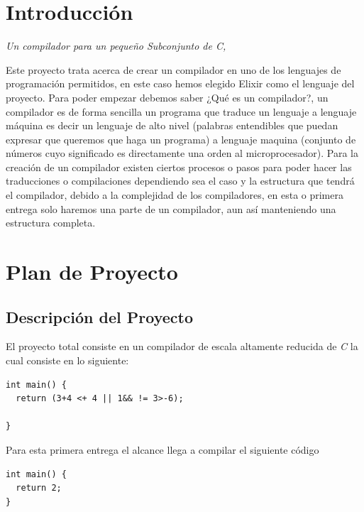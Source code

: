 \documentclass{article}
\begin{document}
\tableofcontents{}

\section{Introducción}

\begin{flushright}
\textit{Un compilador para un pequeño Subconjunto de C,}  
\end{flushright}


Este proyecto trata acerca de crear un compilador en uno de los lenguajes de
programación permitidos, en este caso hemos elegido Elixir como el lenguaje
del proyecto. Para poder empezar debemos saber ¿Qué es un compilador?, un
compilador es de forma sencilla un programa que traduce un lenguaje a lenguaje
máquina es decir un lenguaje de alto nivel (palabras entendibles que puedan
expresar que queremos que haga un programa) a lenguaje maquina (conjunto
de números cuyo significado es directamente una orden al microprocesador).
Para la creación de un compilador existen ciertos procesos o pasos para poder
hacer las traducciones o compilaciones dependiendo sea el caso y la estructura
que tendrá el compilador, debido a la complejidad de los compiladores, en esta
o primera entrega solo haremos una parte de un compilador, aun así manteniendo
una estructura completa.

\section{Plan de Proyecto}

\subsection{Descripción del Proyecto}

El proyecto total consiste en un compilador de escala altamente reducida de
\textit{C} la cual consiste en lo siguiente:

\begin{lstlisting}[style=C]
int main() {
  return (3+4 <+ 4 || 1&& != 3>-6);

}
\end{lstlisting}

Para esta primera entrega el alcance llega a compilar el siguiente código

\begin{lstlisting}[style=C]
int main() {
  return 2;
}
\end{lstlisting}
\end{document}
